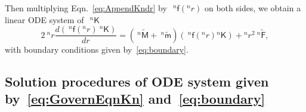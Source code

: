 \documentclass[preprint,10pt,times]{elsarticle}
\numberwithin{equation}{section}
\renewcommand{\u}[1]{\boldsymbol{#1}}
\newcommand{\usf}[1]{\u{\mathsf #1}}
\newcommand{\pr}[1]{\left( #1 \right)}
\renewcommand{\>}{$\Rightarrow$}
\begin{document}
Then multiplying Eqn.~\eqref{eq:AppendKndr} by~$~^{n}\usf{f}({}^{n}\!r)$ on both sides, we obtain a linear ODE system of~$~^{n}{\usf{K}}$
\begin{equation}
	2 ~^{n}\!{r} \frac{d \pr{~^{n}\usf{f}({}^{n}\!r)~^{n}{\usf{K}}}}{dr} = \pr{~^{n}\tilde{\usf{M}} + ~^{n}\tilde{\usf{m}}} \pr{~^{n}\usf{f}({}^{n}\!r){}^{n}{\usf{K}}} + {}^{n}\!r^2 ~^{n}\tilde{\usf{F}},
	\label{eq:AppendKn}
\end{equation}
with boundary conditions given by~\eqref{eq:boundary}.


\subsection{Solution procedures of ODE system given by~\eqref{eq:GovernEqnKn} and~\eqref{eq:boundary}}
\label{Appen:SolvingODE}
\end{document}
